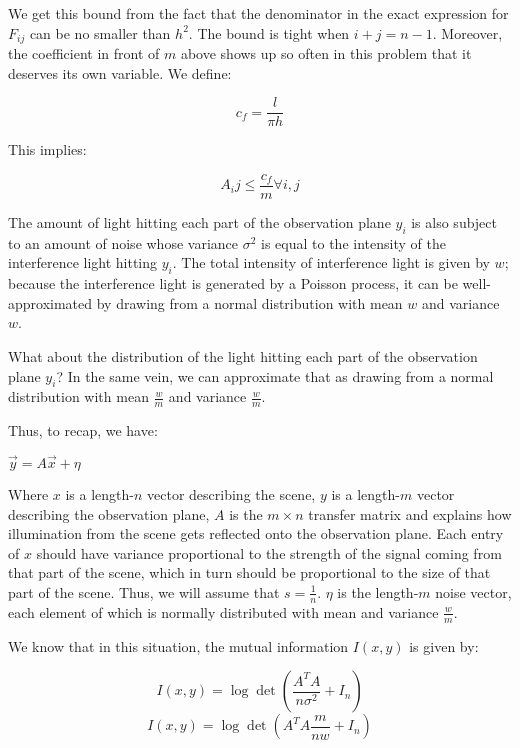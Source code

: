 \documentclass[11pt]{article}
\begin{document}
We get this bound from the fact that the denominator in the exact expression for $F_{ij}$ can be no smaller than $h^2$. The bound is tight when $i+j = n-1$. %
Moreover, the coefficient in front of $m$ above shows up so often in this problem that it deserves its own variable. We define:

\begin{equation}
    c_f = \frac{l}{\pi h}
\end{equation}

This implies: 

\begin{equation}
    \label{eq:upboundcf}
    A_ij \le \frac{c_f}{m} \forall i, j
\end{equation}

The amount of light hitting each part of the observation plane $y_i$ is also subject to an amount of noise whose variance $\sigma^2$ is equal to the intensity of the interference light hitting $y_i$. The total intensity of interference light is given by $w$; because the interference light is generated by a Poisson process, it can be well-approximated by drawing from a normal distribution with mean $w$ and variance $w$.

What about the distribution of the light hitting each part of the observation plane $y_i$? In the same vein, we can approximate that as drawing from a normal distribution with mean $\frac{w}{m}$ and variance $\frac{w}{m}$.

Thus, to recap, we have:

$\vec{y} = A\vec{x} + \eta$

Where $x$ is a length-$n$ vector describing the scene, $y$ is a length-$m$ vector describing the observation plane, $A$ is the $m \times n$ transfer matrix and explains how illumination from the scene gets reflected onto the observation plane. Each entry of $x$ should have variance proportional to the strength of the signal coming from that part of the scene, which in turn should be proportional to the size of that part of the scene. Thus, we will assume that $s = \frac{1}{n}$. $\eta$ is the length-$m$ noise vector, each element of which is normally distributed with mean and variance $\frac{w}{m}$.

We know that in this situation, the mutual information $I(x, y)$ is given by:

\begin{equation}
    I(x, y) = \log \det(\frac{A^T A}{n \sigma^2} + I_n)
\end{equation}
\begin{equation}
    I(x, y) = \log \det(A^T A \frac{m}{n w} + I_n)
\end{equation}
\end{document}
